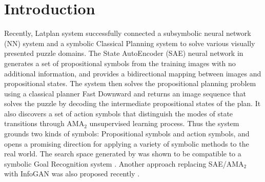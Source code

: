 \section{Introduction}


% 
% 
Recently, Latplan system \cite{Asai2018} successfully
connected a subsymbolic neural network (NN) system and a symbolic Classical Planning system
to solve various visually presented puzzle domains.
The State AutoEncoder (SAE) neural network in \latentplanner
generates a set of propositional symbols from the training images with no additional information,
and provides a bidirectional mapping between images and propositional states.
% 
The system then solves the propositional planning problem using a classical planner Fast Downward \cite{Helmert04}
and returns an image sequence that solves the puzzle
by decoding the intermediate propositional states of the plan.
It also discovers a set of action symbols that distinguish the modes of
state transitions through AMA$_2$ unsupervised learning process.
Thus the system grounds two kinds of symbols:
Propositional symbols and action symbols,
% 
and opens a promising direction for applying a variety of symbolic methods to the real world.
The search space generated by \latentplanner was shown to be compatible
to a symbolic Goal Recognition system \cite{amado2018goal}.
Another approach replacing SAE/AMA$_2$ with InfoGAN was also proposed recently \cite{kurutach2018learning}.

